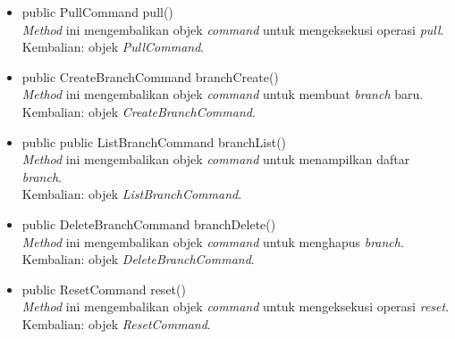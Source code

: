 \begin{itemize}
\item public PullCommand pull()\\
\textit{Method} ini mengembalikan objek \textit{command} untuk mengeksekusi operasi \textit{pull}.\\
Kembalian: objek \textit{PullCommand}.

\item public CreateBranchCommand branchCreate()\\
\textit{Method} ini mengembalikan objek \textit{command} untuk membuat \textit{branch} baru.\\
Kembalian: objek \textit{CreateBranchCommand}.

\item public public ListBranchCommand branchList()\\
\textit{Method} ini mengembalikan objek \textit{command} untuk menampilkan daftar \textit{branch}.\\
Kembalian: objek \textit{ListBranchCommand}.

\item public DeleteBranchCommand branchDelete()\\
\textit{Method} ini mengembalikan objek \textit{command} untuk menghapus \textit{branch}.\\
Kembalian: objek \textit{DeleteBranchCommand}.

\item public ResetCommand reset()\\
\textit{Method} ini mengembalikan objek \textit{command} untuk mengeksekusi operasi \textit{reset}.\\
Kembalian: objek \textit{ResetCommand}.
\end{itemize}

